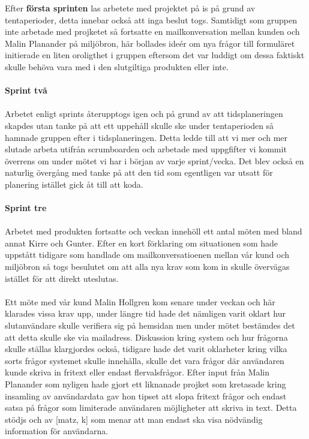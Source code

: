 \documentclass[12pt]{article}
\begin{document}
Efter \textbf{första sprinten} las arbetete med projektet på is på grund av tentaperioder, detta innebar också att inga beslut togs. Samtidigt som gruppen inte arbetade med projketet så fortsatte en mailkonversation mellan kunden och Malin Planander på miljöbron, här bollades ideér om nya frågor till formuläret initierade en liten oroligthet i gruppen eftersom det var luddigt om dessa faktiskt skulle behöva vara med i den slutgiltiga produkten eller inte.\\\\
\textbf{Sprint två}\\\\
Arbetet enligt sprints återupptogs igen och på grund av att tidsplaneringen skapdes utan tanke på att ett uppehåll skulle ske under tentaperioden så hamnade gruppen efter i tidsplaneringen. Detta ledde till att vi mer och mer slutade arbeta utifrån scrumboarden och arbetade med uppgfifter vi kommit överrens om under mötet vi har i början av varje sprint/vecka. Det blev också en naturlig övergång med tanke på att den tid som egentligen var utsatt för planering istället gick åt till att koda. \\\\
\textbf{Sprint tre} \\\\
Arbetet med produkten fortsatte och veckan innehöll ett antal möten med bland annat Kirre och Gunter. Efter en kort förklaring om situationen som hade uppstått tidigare som handlade om mailkonversatioenen mellan vår kund och miljöbron så togs besulutet om att alla nya krav som kom in skulle övervägas istället för att direkt uteslutas. \\\\
Ett möte med vår kund Malin Hollgren kom senare under veckan och här klarades vissa krav upp, under längre tid hade det nämligen varit oklart hur slutanvändare skulle verifiera sig på hemsidan men under mötet bestämdes det att detta skulle ske via mailadress. Diskussion kring system och hur frågorna skulle ställas klargjordes också, tidigare hade det varit oklarheter kring vilka sorts frågor systemet skulle innehålla, skulle det vara frågor där användaren kunde skriva in fritext eller endast flervalsfrågor. Efter input från Malin Planander som nyligen hade gjort ett liknanade projket som kretasade kring insamling av användardata gav hon tipset att slopa fritext frågor och endast satsa på frågor som limiterade användaren möjligheter att skriva in text. Detta stödjs och av [matz, k] som menar att man endast ska visa nödvändig information för användarna.  
\end{document}
